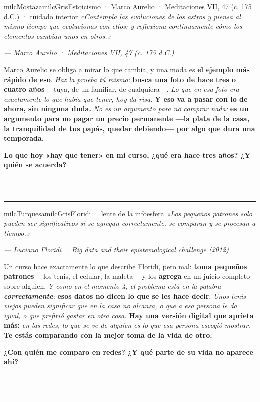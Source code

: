\documentclass[11pt,letterpaper]{article}
\newcommand{\linead}[1]{\noindent\color{milcLinea}\rule{#1}{0.5pt}\color{milcNegro}}
\begin{document}
\begin{softbox}{milcMostaza}{milcGris}{Estoicismo · Marco Aurelio · Meditaciones VII, 47 (c. 175 d.C.) · cuidado interior}
\textit{«Contempla las evoluciones de los astros y piensa al mismo tiempo que evolucionas con ellos; y reflexiona continuamente cómo los elementos cambian unos en otros.»}

{\footnotesize\itshape\color{milcNegro!70}--- Marco Aurelio · Meditaciones VII, 47 (c. 175 d.C.)}

Marco Aurelio se obliga a mirar lo que cambia, y una moda es \textbf{el ejemplo más rápido de eso}. \emph{Haz la prueba tú mismo:} \textbf{busca una foto de hace tres o cuatro años} ---tuya, de un familiar, de cualquiera---. \emph{Lo que en esa foto era exactamente lo que había que tener, hoy da risa.} \textbf{Y eso va a pasar con lo de ahora, sin ninguna duda.} \emph{No es un argumento para no comprar nada:} \textbf{es un argumento para no pagar un precio permanente ---la plata de la casa, la tranquilidad de tus papás, quedar debiendo--- por algo que dura una temporada.}

\textbf{Lo que hoy «hay que tener» en mi curso, ¿qué era hace tres años? ¿Y quién se acuerda?}
\end{softbox}
\linead{\linewidth}\\[1mm]
\linead{\linewidth}

\begin{softbox}{milcTurquesa}{milcGris}{Floridi · lente de la infoesfera}
\textit{«Los pequeños patrones solo pueden ser significativos si se agregan correctamente, se comparan y se procesan a tiempo.»}

{\footnotesize\itshape\color{milcNegro!70}--- Luciano Floridi · Big data and their epistemological challenge (2012)}

Un curso hace exactamente lo que describe Floridi, pero mal: \textbf{toma pequeños patrones} ---los tenis, el celular, la maleta--- y los \textbf{agrega} en un juicio completo sobre alguien. \emph{Y como en el momento 4, el problema está en la palabra \textbf{correctamente}:} \textbf{esos datos no dicen lo que se les hace decir}. \emph{Unos tenis viejos pueden significar que en la casa no alcanza, o que a esa persona le da igual, o que prefirió gastar en otra cosa.} \textbf{Hay una versión digital que aprieta más:} \emph{en las redes, lo que se ve de alguien es lo que esa persona escogió mostrar}. \textbf{Te estás comparando con la mejor toma de la vida de otro.}

\textbf{¿Con quién me comparo en redes? ¿Y qué parte de su vida no aparece ahí?}
\end{softbox}
\linead{\linewidth}\\[1mm]
\linead{\linewidth}
\end{document}
